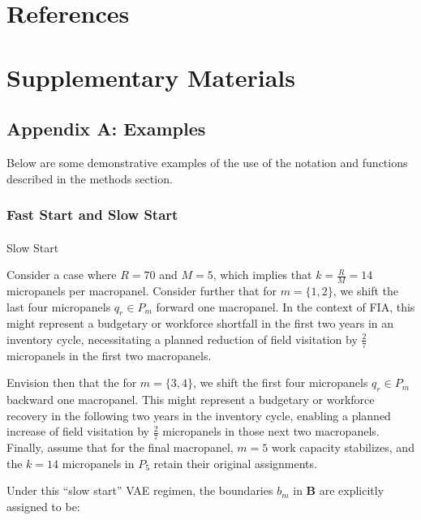 \documentclass[
  number]{elsarticle}
\makeatletter
\let\oldparagraph\paragraph
\renewcommand{\paragraph}{
    \@ifstar
      \xxxParagraphStar
      \xxxParagraphNoStar
  }
\newcommand{\xxxParagraphStar}[1]{\oldparagraph*{#1}\mbox{}}
\newcommand{\xxxParagraphNoStar}[1]{\oldparagraph{#1}\mbox{}}
\makeatother
\begin{document}
\section*{References}\label{references}

\section{Supplementary Materials}\label{sec-supp-mat}

\subsection{Appendix A: Examples}\label{appendix-a-examples}

Below are some demonstrative examples of the use of the notation and
functions described in the methods section.

\subsubsection{Fast Start and Slow
Start}\label{fast-start-and-slow-start}

\paragraph{Slow Start}\label{slow-start-1}

Consider a case where \(R = 70\) and \(M = 5\), which implies that
\(k = \frac{R}{M} = 14\) micropanels per macropanel. Consider further
that for \(m = \{1,2\}\), we shift the last four micropanels
\(q_r \in P_m\) forward one macropanel. In the context of FIA, this
might represent a budgetary or workforce shortfall in the first two
years in an inventory cycle, necessitating a planned reduction of field
visitation by \(\frac{2}{7}\) micropanels in the first two macropanels.

Envision then that the for \(m = \{3,4\}\), we shift the first four
micropanels \(q_r \in P_m\) backward one macropanel. This might
represent a budgetary or workforce recovery in the following two years
in the inventory cycle, enabling a planned increase of field visitation
by \(\frac{2}{7}\) micropanels in those next two macropanels. Finally,
assume that for the final macropanel, \(m = 5\) work capacity
stabilizes, and the \(k = 14\) micropanels in \(P_5\) retain their
original assignments.

Under this ``slow start'' VAE regimen, the boundaries \(b_m\) in
\(\mathbf{B}\) are explicitly assigned to be:
\end{document}
